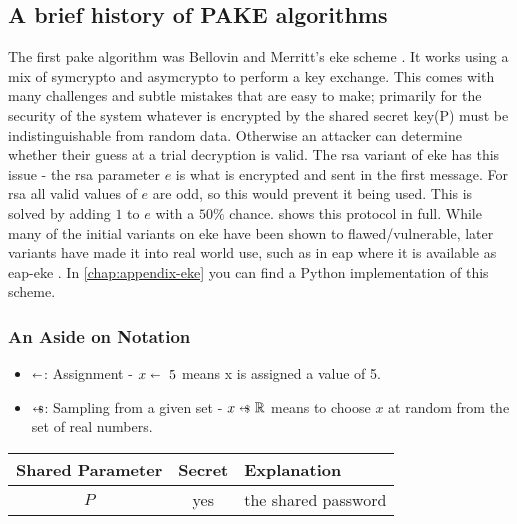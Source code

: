 \subsection{A brief history of PAKE algorithms}
The first \gls{pake} algorithm was Bellovin and Merritt's \gls{eke} scheme \cite{eke}.
It works using a mix of \gls{symcrypto} and \gls{asymcrypto} to perform a key exchange.
This comes with many challenges and subtle mistakes that are easy to make;
primarily for the security of the system whatever is encrypted by the shared secret key(P) must be indistinguishable from random data.
Otherwise an attacker can determine whether their guess at a trial decryption is valid.
The \gls{rsa} variant of \gls{eke} has this issue - the \gls{rsa} parameter $e$ is what is encrypted and sent in the first message.
For \gls{rsa} all valid values of $e$ are odd, so this would prevent it being used.
This is solved by adding $1$ to $e$ with a $50\%$ chance.
 shows this protocol in full. While many of the initial variants on \gls{eke} have been shown to flawed/vulnerable, later variants have made it into real world use, such as in \gls{eap} \cite{eap} where it is available as \gls{eap}-\gls{eke} \cite{eap-eke}.
In \cref{chap:appendix-eke} you can find a Python implementation of this scheme.

\subsubsection{An Aside on Notation}
\begin{itemize}
  \item $\shortleftarrow$: Assignment - $x \shortleftarrow \ 5$ means x is assigned a value of 5.
  \item $\shortleftarrow\kern-1.5ex\text{\scriptsize \$}$: Sampling from a given set - $x \cryptoSample \ \mathbb{R}$ means to choose $x$ at random from the set of real numbers.
\end{itemize}

\begin{center}
  \begin{tabular}{ ccl }
    \toprule
    Shared Parameter & Secret & Explanation \\
    \midrule
    $P$ & yes & the shared password \\
    \bottomrule
  \end{tabular}
\end{center}

